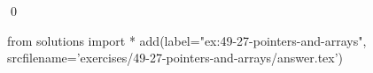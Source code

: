 
\begin{ex}
  \label{ex:49-27-pointers-and-arrays}
  
  \qed
\end{ex}
\begin{python0}
from solutions import *
add(label="ex:49-27-pointers-and-arrays",
    srcfilename='exercises/49-27-pointers-and-arrays/answer.tex')
\end{python0}
